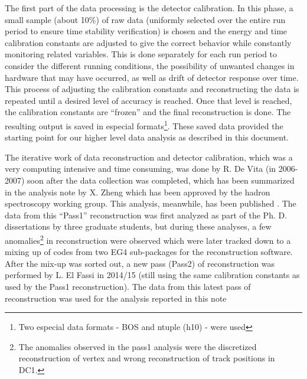 The first part of the data processing is the detector calibration. In this phase, a small sample (about 10\%) of raw data (uniformly selected over the entire run period to ensure time stability verification) is chosen and the energy and time calibration constants are adjusted to give the correct behavior while constantly monitoring related variables. This is done separately for each run period to consider the different running conditions, the possibility of unwanted changes in hardware that may have occurred, as well as drift of detector response over time. This process of adjusting the calibration constants and reconstructing the data is repeated until a desired level of accuracy is reached. Once that level is reached, the calibration constants are ``frozen'' and the final reconstruction is done. The resulting output is saved in especial formats\footnote{Two especial data formats - BOS and ntuple (h10) - were used}.
These saved data provided the starting point for our higher level data analysis as described in this document. %

The iterative work of data reconstruction and detector calibration, which was a very computing intensive and time consuming, was done by R. De Vita (in 2006-2007)%
soon after the data collection was completed, which has been summarized in the analysis note \cite{anaNoteXZheng} by X. Zheng which has been approved by the hadron spectroscopy working group. This analysis, meanwhile, has been published \cite{PhysRevC.94.045206}. The data from this ``Pass1'' reconstruction was first analyzed as part of the Ph. D. dissertations by three graduate students, but during these analyses, a few anomalies\footnote{The anomalies observed in the pass1 analysis were the discretized reconstruction of vertex and wrong reconstruction of track positions in DC1.} in reconstruction were observed which were later tracked down to a %
mixing up of codes from two EG4 sub-packages for the reconstruction software. After the mix-up was sorted out, a new pass (Pass2) of reconstruction was performed by L. El Fassi in 2014/15 (still using the same calibration constants as used by the Pass1 reconstruction). The data from this latest pass of reconstruction was used for the analysis reported in this note 


